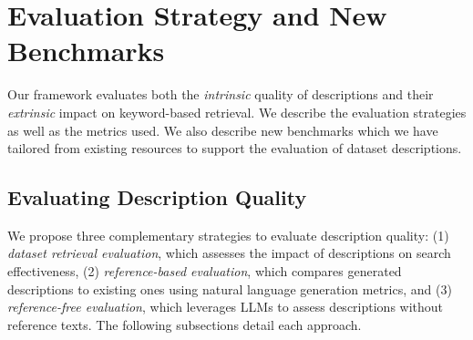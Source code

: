 \section{Evaluation Strategy and New Benchmarks}

% 
Our framework evaluates both the \textit{intrinsic} quality of descriptions and their \textit{extrinsic} impact on keyword-based retrieval. We describe the evaluation strategies as well as the metrics used. 
% 
We also describe new benchmarks which we have tailored from existing resources to support the evaluation of dataset descriptions.


\subsection{Evaluating Description Quality}
\label{sec:solution_evaluation}


We propose three complementary strategies to evaluate description quality: (1) \textit{dataset retrieval evaluation}, which assesses the impact of descriptions on search effectiveness, (2) \textit{reference-based evaluation}, which compares generated descriptions to existing ones using natural language generation metrics, and (3) \textit{reference-free evaluation}, which leverages LLMs to assess descriptions without reference texts. The following subsections detail each approach.



